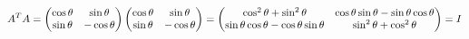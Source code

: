 \documentclass[preview]{standalone}
\begin{document}
\begin{align*}
\special{dvisvgm:raw <g id='unique000'>}A^TA=\begin{pmatrix}\cos\theta&\sin\theta\\\sin\theta&-\cos\theta\end{pmatrix}\begin{pmatrix}\cos\theta&\sin\theta\\\sin\theta&-\cos\theta\end{pmatrix}=\begin{pmatrix}\cos^2\theta+\sin^2\theta&\cos\theta\sin\theta-\sin\theta\cos\theta\\\sin\theta\cos\theta-\cos\theta\sin\theta&\sin^2\theta+\cos^2\theta\end{pmatrix}=I\special{dvisvgm:raw </g>}
\end{align*}
\end{document}
